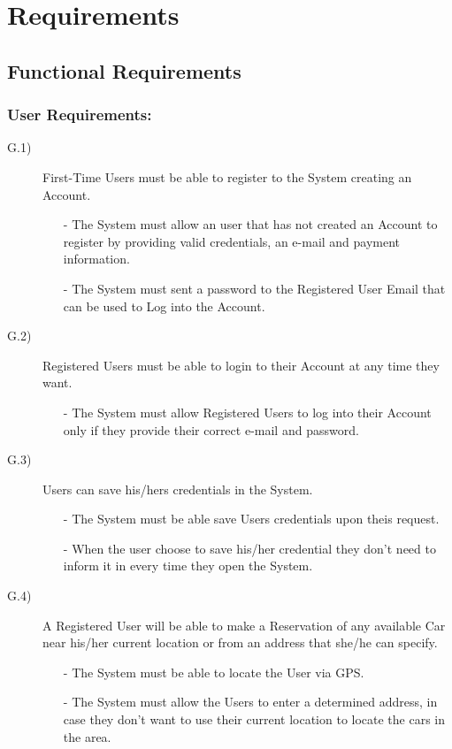 \documentclass[a4paper]{article}
\begin{document}
\section{Requirements}
\subsection{Functional Requirements}
\subsubsection{\textbf{User Requirements:}}
\begin{description}
\item [G.1)]First-Time Users must be able to register to the System creating an Account. 
\begin{itemize}
	\item[-]The System must allow an user that has not created an Account to register by providing valid credentials, an e-mail and payment information.
	\item[-]The System must sent a password to the Registered User Email that can be used to Log into the Account.
\end{itemize}
\item [G.2)]Registered Users must be able to login to their Account at any time they want.
\begin{itemize}
	\item[-]The System must allow Registered Users to log into their Account only if they provide their correct e-mail and password.
\end{itemize}
\item [G.3)]Users can save his/hers credentials in the System.
\begin{itemize}
	\item[-]The System must be able save Users credentials upon theis request.
	\item[-]When the user choose to save his/her credential they don't need to inform it in every time they open the System.
\end{itemize}
\item [G.4)]A Registered User will be able to make a Reservation of any available Car near his/her current location or from an address that she/he can specify.
\begin{itemize}
	\item[-]The System must be able to locate the User via GPS.
	\item[-]The System must allow the Users to enter a determined address, in case they don't want to use their current location to locate the cars in the area.

\end{itemize}
\end{description}
\end{document}

